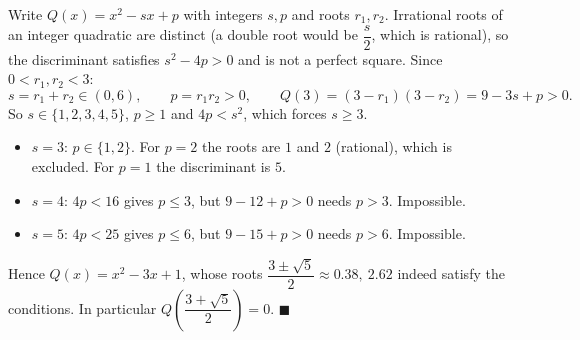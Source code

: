 Write $Q(x)=x^2-sx+p$ with integers $s,p$ and roots $r_1,r_2$. Irrational roots of an integer quadratic are distinct (a double root would be $\dfrac s2$, which is rational), so the discriminant satisfies $s^2-4p>0$ and is not a perfect square. Since $0<r_1,r_2<3$:
\[s=r_1+r_2\in(0,6),\qquad p=r_1r_2>0,\qquad Q(3)=(3-r_1)(3-r_2)=9-3s+p>0.\]
So $s\in\{1,2,3,4,5\}$, $p\ge1$ and $4p<s^2$, which forces $s\ge3$.
\begin{itemize}
\item $s=3$: $p\in\{1,2\}$. For $p=2$ the roots are $1$ and $2$ (rational), which is excluded. For $p=1$ the discriminant is $5$.
\item $s=4$: $4p<16$ gives $p\le3$, but $9-12+p>0$ needs $p>3$. Impossible.
\item $s=5$: $4p<25$ gives $p\le6$, but $9-15+p>0$ needs $p>6$. Impossible.
\end{itemize}
Hence $Q(x)=x^2-3x+1$, whose roots $\dfrac{3\pm\sqrt5}{2}\approx0.38,\ 2.62$ indeed satisfy the conditions. In particular $Q\left(\dfrac{3+\sqrt5}{2}\right)=0$. $\blacksquare$
